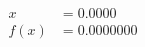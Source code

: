 \documentclass[preview]{standalone}
\begin{document}
\begin{align*}
x &= 0.0000\\f(x) &= 0.0000000
\end{align*}
\end{document}
